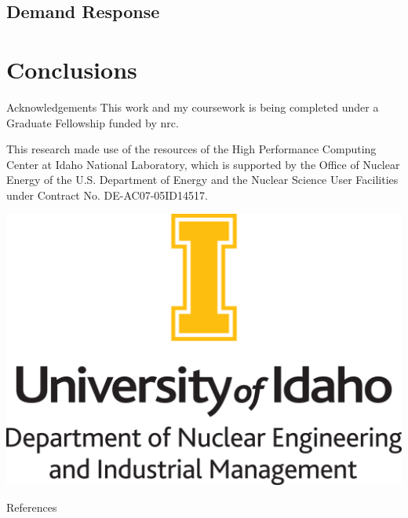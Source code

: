 \documentclass[aspectratio=169,pdftex,dvipsnames]{beamer}
\newcommand\noside{\addtolength\textwidth{2cm} 
\setlength\hsize{\textwidth} 
\setlength\columnwidth{\textwidth}
\vfill\centering}
\newcommand{\acf}{\acrfull} %
\begin{document}
\subsection{Demand Response}

\section{Conclusions}


\begin{frame}{Acknowledgements}
    \centering
    This work and my coursework is being completed under a Graduate Fellowship funded by \acf{nrc}.

    This research made use of the resources of the High Performance Computing Center at Idaho National Laboratory, which is supported by the Office of Nuclear Energy of the U.S. Department of Energy and the Nuclear Science User Facilities under Contract No. DE-AC07-05ID14517.
\end{frame}

\begin{frame}[plain]{}
    \noside
    \includegraphics[height=0.9\textheight]{logo}
    \vfill
\end{frame}


\begin{frame}[allowframebreaks]{References}
    
    \footnotesize
    
\end{frame}
\end{document}
